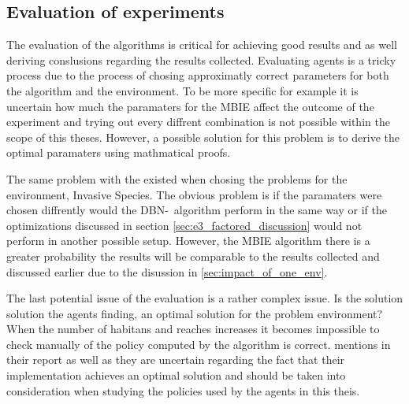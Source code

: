 \subsection{Evaluation of experiments }
The evaluation of the algorithms is critical for achieving good results and as well deriving conslusions regarding the results collected. Evaluating agents is a tricky process due to the process of chosing approximatly correct parameters for both the algorithm and the environment. To be more specific for example it is uncertain how much the paramaters for the MBIE affect the outcome of the experiment and trying out every diffrent combination is not possible within the scope of this theses. However, a possible solution for this problem is to derive the optimal paramaters using mathmatical proofs.

The same problem with the existed when chosing the problems for the environment, Invasive Species. The obvious problem is if the paramaters were chosen diffrently would the DBN-\etre\ algorithm perform in the same way or if the optimizations discussed in section \ref{sec:e3_factored_discussion} would not perform in another possible setup. However, the MBIE algorithm there is a greater probability the results will be comparable to the results collected and discussed earlier due to the disussion in \ref{sec:impact_of_one_env}.

The last potential issue of the evaluation is a rather complex issue. Is the solution solution the agents finding, an optimal solution for the problem environment? When the number of habitans and reaches increases it becomes impossible to check manually of the policy computed by the algorithm is correct. \textcite{dietterich2013pac} mentions in their report as well as they are uncertain regarding the fact that their implementation achieves an optimal solution and should be taken into consideration when studying the policies used by the agents in this theis.